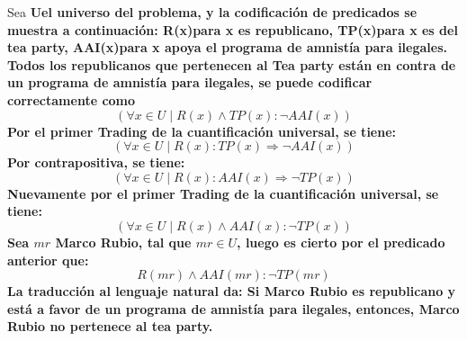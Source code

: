 \documentclass[12pt]{article}
\begin{document}
Sea \bf{U}\rm el universo del problema, y la codificaci\'on de predicados se
muestra a continuaci\'on: \bf{R(x)}\rm para x es republicano, \bf{TP(x)}\rm para
x es del tea party, \bf{AAI(x)}\rm para x apoya el programa de amnist\'ia para
ilegales.\\
Todos los republicanos que pertenecen al Tea party est\'an en contra de un
programa de amnist\'ia para ilegales, se puede codificar correctamente como 
$$(\forall x \in U \mid R(x) \wedge TP(x): \neg AAI(x))$$
Por el primer Trading de la cuantificaci\'on universal, se tiene:
$$(\forall x \in U \mid R(x): TP(x) \Rightarrow \neg AAI(x))$$
Por contrapositiva, se tiene:
$$(\forall x \in U \mid R(x): AAI(x)  \Rightarrow \neg TP(x) )$$
Nuevamente por el primer Trading de la cuantificaci\'on universal, se tiene:
$$(\forall x \in U \mid R(x) \wedge AAI(x): \neg TP(x))$$
Sea $mr$ Marco Rubio, tal que $mr \in U$, luego es cierto por el predicado
anterior que:
$$R(mr) \wedge AAI(mr): \neg TP(mr)$$
La traducci\'on al lenguaje natural da:
Si Marco Rubio es republicano y est\'a a favor de un
programa de amnist\'ia para ilegales, entonces, Marco Rubio no pertenece al tea
party.
  
 
\end{document}
